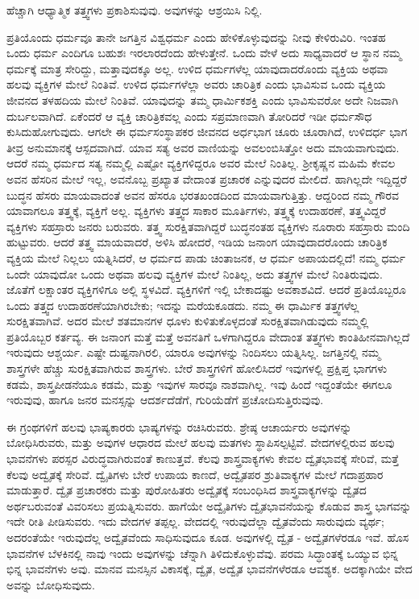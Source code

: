 ಹೆಚ್ಚಾಗಿ ಆಧ್ಯಾತ್ಮಿಕ ತತ್ತ್ವಗಳು ಪ್ರಕಾಶಿಸುವುವು. ಅವುಗಳನ್ನು ಆಶ್ರಯಿಸಿ ನಿಲ್ಲಿ.

ಪ್ರತಿಯೊಂದು ಧರ್ಮವೂ ತಾನೇ ಜಗತ್ತಿನ ವಿಶ್ವಧರ್ಮ ಎಂದು ಹೇಳಿಕೊಳ್ಳುವುದನ್ನು ನೀವು ಕೇಳಿರುವಿರಿ. ಇಂತಹ ಒಂದು ಧರ್ಮ ಎಂದಿಗೂ ಬಹುಶಃ ಇರಲಾರದೆಂದು ಹೇಳುತ್ತೇನೆ. ಒಂದು ವೇಳೆ ಅದು ಸಾಧ್ಯವಾದರೆ ಆ ಸ್ಥಾನ ನಮ್ಮ ಧರ್ಮಕ್ಕೆ ಮಾತ್ರ ಸೇರಿದ್ದು, ಮತ್ತಾವುದಕ್ಕೂ ಅಲ್ಲ. ಉಳಿದ ಧರ್ಮಗಳೆಲ್ಲ ಯಾವುದಾದರೊಂದು ವ್ಯಕ್ತಿಯ ಅಥವಾ ಹಲವು ವ್ಯಕ್ತಿಗಳ ಮೇಲೆ ನಿಂತಿವೆ. ಉಳಿದ ಧರ್ಮಗಳೆಲ್ಲಾ ಅವರು ಚಾರಿತ್ರಿಕ ಎಂದು ಭಾವಿಸುವ ಒಂದು ವ್ಯಕ್ತಿಯ ಜೀವನದ ತಳಹದಿಯ ಮೇಲೆ ನಿಂತಿವೆ. ಯಾವುದನ್ನು ತಮ್ಮ ಧಾರ್ಮಿಕಶಕ್ತಿ ಎಂದು ಭಾವಿಸುವರೋ ಅದೇ ನಿಜವಾಗಿ ದುರ್ಬಲವಾಗಿದೆ. ಏಕೆಂದರೆ ಆ ವ್ಯಕ್ತಿ ಚಾರಿತ್ರಿಕವಲ್ಲ ಎಂದು ಸಪ್ರಮಾಣವಾಗಿ ತೋರಿದರೆ ಇಡೀ ಧರ್ಮಸೌಧ ಕುಸಿದುಹೋಗುವುದು. ಆಗಲೇ ಈ ಧರ್ಮಸಂಸ್ಥಾಪಕರ ಜೀವನದ ಅರ್ಧಭಾಗ ಚೂರು ಚೂರಾಗಿದೆ, ಉಳಿದರ್ಧ ಭಾಗ ತೀವ್ರ ಅನುಮಾನಕ್ಕೆ ಆಸ್ಪದವಾಗಿದೆ. ಯಾವ ಸತ್ಯ ಅವರ ವಾಣಿಯನ್ನು ಅವಲಂಬಿಸಿತ್ತೋ ಅದು ಮಾಯವಾಗುವುದು. ಆದರೆ ನಮ್ಮ ಧರ್ಮದ ಸತ್ಯ ನಮ್ಮಲ್ಲಿ ಎಷ್ಟೋ ವ್ಯಕ್ತಿಗಳಿದ್ದರೂ ಅವರ ಮೇಲೆ ನಿಂತಿಲ್ಲ. ಶ‍್ರೀಕೃಷ್ಣನ ಮಹಿಮೆ ಕೇವಲ ಅವನ ಹೆಸರಿನ ಮೇಲೆ ಇಲ್ಲ, ಅವನೊಬ್ಬ ಪ್ರಖ್ಯಾತ ವೇದಾಂತ ಪ್ರಚಾರಕ ಎನ್ನುವುದರ ಮೇಲಿದೆ. ಹಾಗಿಲ್ಲದೇ ಇದ್ದಿದ್ದರೆ ಬುದ್ಧನ ಹೆಸರು ಮಾಯವಾದಂತೆ ಅವನ ಹೆಸರೂ ಭರತಖಂಡದಿಂದ ಮಾಯವಾಗುತ್ತಿತ್ತು. ಆದ್ದರಿಂದ ನಮ್ಮ ಗೌರವ ಯಾವಾಗಲೂ ತತ್ತ್ವಕ್ಕೆ, ವ್ಯಕ್ತಿಗೆ ಅಲ್ಲ. ವ್ಯಕ್ತಿಗಳು ತತ್ತ್ವದ ಸಾಕಾರ ಮೂರ್ತಿಗಳು, ತತ್ತ್ವಕ್ಕೆ ಉದಾಹರಣೆ, ತತ್ತ್ವವಿದ್ದರೆ ವ್ಯಕ್ತಿಗಳು ಸಹಸ್ರಾರು ಜನರು ಬರುವರು. ತತ್ತ್ವ ಸುರಕ್ಷಿತವಾಗಿದ್ದರೆ ಬುದ್ಧನಂತಹ ವ್ಯಕ್ತಿಗಳು ನೂರಾರು ಸಹಸ್ರಾರು ಮಂದಿ ಹುಟ್ಟುವರು. ಆದರೆ ತತ್ತ್ವ ಮಾಯವಾದರೆ, ಅಳಿಸಿ ಹೋದರೆ, ಇಡಿಯ ಜನಾಂಗ ಯಾವುದಾದರೊಂದು ಚಾರಿತ್ರಿಕ ವ್ಯಕ್ತಿಯ ಮೇಲೆ ನಿಲ್ಲಲು ಯತ್ನಿಸಿದರೆ, ಆ ಧರ್ಮದ ಪಾಡು ಚಿಂತಾಜನಕ, ಆ ಧರ್ಮ ಅಪಾಯದಲ್ಲಿದೆ! ನಮ್ಮ ಧರ್ಮ ಒಂದೇ ಯಾವುದೋ ಒಂದು ಅಥವಾ ಹಲವು ವ್ಯಕ್ತಿಗಳ ಮೇಲೆ ನಿಂತಿಲ್ಲ, ಅದು ತತ್ತ್ವಗಳ ಮೇಲೆ ನಿಂತಿರುವುದು. ಜೊತೆಗೆ ಲಕ್ಷಾಂತರ ವ್ಯಕ್ತಿಗಳಿಗೂ ಅಲ್ಲಿ ಸ್ಥಳವಿದೆ. ವ್ಯಕ್ತಿಗಳಿಗೆ ಇಲ್ಲಿ ಬೇಕಾದಷ್ಟು ಅವಕಾಶವಿದೆ. ಆದರೆ ಪ್ರತಿಯೊಬ್ಬರೂ ಒಂದು ತತ್ತ್ವದ ಉದಾಹರಣೆಯಾಗಿರಬೇಕು; ಇದನ್ನು ಮರೆಯಕೂಡದು. ನಮ್ಮ ಈ ಧಾರ್ಮಿಕ ತತ್ತ್ವಗಳೆಲ್ಲ ಸುರಕ್ಷಿತವಾಗಿವೆ. ಅದರ ಮೇಲೆ ಶತಮಾನಗಳ ಧೂಳು ಕುಳಿತುಕೊಳ್ಳದಂತೆ ಸುರಕ್ಷಿತವಾಗಿಡುವುದು ನಮ್ಮಲ್ಲಿ ಪ್ರತಿಯೊಬ್ಬರ ಕರ್ತವ್ಯ. ಈ ಜನಾಂಗ ಮತ್ತೆ ಮತ್ತೆ ಅವನತಿಗೆ ಒಳಗಾಗಿದ್ದರೂ ವೇದಾಂತ ತತ್ತ್ವಗಳು ಕಾಂತಿಹೀನವಾಗಿಲ್ಲದೆ ಇರುವುದು ಆಶ್ಚರ್ಯ. ಎಷ್ಟೇ ದುಷ್ಟನಾಗಿರಲಿ, ಯಾರೂ ಅವುಗಳನ್ನು ನಿಂದಿಸಲು ಯತ್ನಿಸಿಲ್ಲ. ಜಗತ್ತಿನಲ್ಲಿ ನಮ್ಮ ಶಾಸ್ತ್ರಗಳೇ ಹೆಚ್ಚು ಸುರಕ್ಷಿತವಾಗಿರುವ ಶಾಸ್ತ್ರಗಳು. ಬೇರೆ ಶಾಸ್ತ್ರಗಳಿಗೆ ಹೋಲಿಸಿದರೆ ಇವುಗಳಲ್ಲಿ ಪ್ರಕ್ಷಿಪ್ತ ಭಾಗಗಳು ಕಡಮೆ, ಶಾಸ್ತ್ರಪೀಡನೆಯೂ ಕಡಮೆ, ಮತ್ತು ಇವುಗಳ ಸಾರವೂ ನಾಶವಾಗಿಲ್ಲ. ಇವು ಹಿಂದೆ ಇದ್ದಂತೆಯೇ ಈಗಲೂ ಇರುವುವು, ಹಾಗೂ ಜನರ ಮನಸ್ಸನ್ನು ಆದರ್ಶದೆಡೆಗೆ, ಗುರಿಯೆಡೆಗೆ ಪ್ರಚೋದಿಸುತ್ತಿರುವುವು.

ಈ ಗ್ರಂಥಗಳಿಗೆ ಹಲವು ಭಾಷ್ಯಕಾರರು ಭಾಷ್ಯಗಳನ್ನು ರಚಿಸಿರುವರು. ಶ್ರೇಷ್ಠ ಆಚಾರ್ಯರು ಅವುಗಳನ್ನು ಬೋಧಿಸಿರುವರು, ಮತ್ತು ಅವುಗಳ ಆಧಾರದ ಮೇಲೆ ಹಲವು ಮತಗಳು ಸ್ಥಾಪಿಸಲ್ಪಟ್ಟಿವೆ. ವೇದಗಳಲ್ಲಿರುವ ಹಲವು ಭಾವನೆಗಳು ಪರಸ್ಪರ ವಿರುದ್ಧವಾಗಿರುವಂತೆ ಕಾಣುತ್ತವೆ. ಕೆಲವು ಶಾಸ್ತ್ರವಾಕ್ಯಗಳು ಕೇವಲ ದ್ವೈತಭಾವಕ್ಕೆ ಸೇರಿವೆ, ಮತ್ತೆ ಕೆಲವು ಅದ್ವೈತಕ್ಕೆ ಸೇರಿವೆ. ದ್ವೈತಿಗಳು ಬೇರೆ ಉಪಾಯ ಕಾಣದೆ, ಅದ್ವೈತಪರ ಶ್ರುತಿವಾಕ್ಯಗಳ ಮೇಲೆ ಗದಾಪ್ರಹಾರ ಮಾಡುತ್ತಾರೆ. ದ್ವೈತ ಪ್ರಚಾರಕರು ಮತ್ತು ಪುರೋಹಿತರು ಅದ್ವೈತಕ್ಕೆ ಸಂಬಂಧಿಸಿದ ಶಾಸ್ತ್ರವಾಕ್ಯಗಳನ್ನು ದ್ವೈತದ ಅರ್ಥಬರುವಂತೆ ವಿವರಿಸಲು ಪ್ರಯತ್ನಿಸುವರು. ಹಾಗೆಯೇ ಅದ್ವೈತಿಗಳು ದ್ವೈತಭಾವನೆಯನ್ನು ಕೊಡುವ ಶಾಸ್ತ್ರ ಭಾಗವನ್ನು ಇದೇ ರೀತಿ ಪೀಡಿಸುವರು. ಇದು ವೇದಗಳ ತಪ್ಪಲ್ಲ. ವೇದದಲ್ಲಿ ಇರುವುದೆಲ್ಲಾ ದ್ವೈತವೆಂದು ಸಾರುವುದು ವ್ಯರ್ಥ; ಅದರಂತೆಯೇ ಇರುವುದೆಲ್ಲ ಅದ್ವೈತವೆಂದು ಸಾಧಿಸುವುದೂ ಕೂಡ. ಅವುಗಳಲ್ಲಿ ದ್ವೈತ - ಅದ್ವೈತಗಳೆರಡೂ ಇವೆ. ಹೊಸ ಭಾವನೆಗಳ ಬೆಳಕಿನಲ್ಲಿ ನಾವು ಇಂದು ಅವುಗಳನ್ನು ಚೆನ್ನಾಗಿ ತಿಳಿದುಕೊಳ್ಳುವೆವು. ಪರಮ ಸಿದ್ಧಾಂತಕ್ಕೆ ಒಯ್ಯುವ ಭಿನ್ನ ಭಿನ್ನ ಭಾವನೆಗಳು ಅವು. ಮಾನವ ಮನಸ್ಸಿನ ವಿಕಾಸಕ್ಕೆ, ದ್ವೈತ, ಅದ್ವೈತ ಭಾವನೆಗಳೆರಡೂ ಆವಶ್ಯಕ. ಅದಕ್ಕಾಗಿಯೇ ವೇದ ಅವನ್ನು ಬೋಧಿಸುವುದು.

